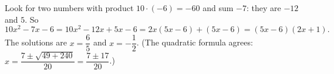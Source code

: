 Look for two numbers with product $10\cdot(-6)=-60$ and sum $-7$: they are $-12$ and $5$. So
\[
10x^2-7x-6=10x^2-12x+5x-6=2x(5x-6)+(5x-6)=(5x-6)(2x+1).
\]
The solutions are $x=\boxed{\dfrac{6}{5}}$ and $x=\boxed{-\dfrac{1}{2}}$. (The quadratic formula agrees: $x=\dfrac{7\pm\sqrt{49+240}}{20}=\dfrac{7\pm17}{20}$.)
